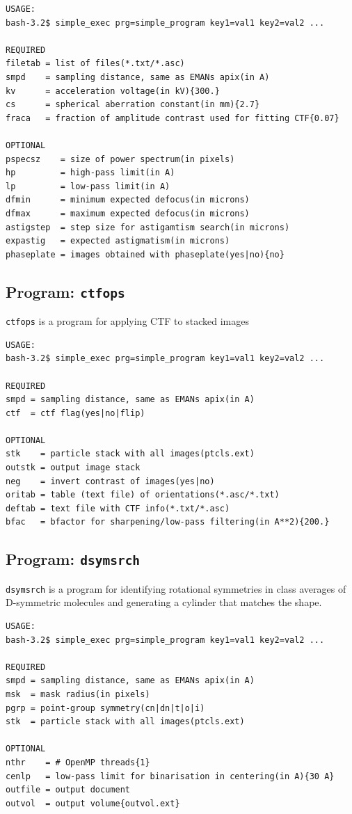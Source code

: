 \documentclass[a4paper,11pt]{article}
\newcommand{\prgname}[1]{\textcolor{NavyBlue}{\texttt{#1}}}
\begin{document}
\begin{verbatim}
USAGE:
bash-3.2$ simple_exec prg=simple_program key1=val1 key2=val2 ...

REQUIRED
filetab = list of files(*.txt/*.asc)
smpd    = sampling distance, same as EMANs apix(in A)
kv      = acceleration voltage(in kV){300.}
cs      = spherical aberration constant(in mm){2.7}
fraca   = fraction of amplitude contrast used for fitting CTF{0.07}

OPTIONAL
pspecsz    = size of power spectrum(in pixels)
hp         = high-pass limit(in A)
lp         = low-pass limit(in A)
dfmin      = minimum expected defocus(in microns)
dfmax      = maximum expected defocus(in microns)
astigstep  = step size for astigamtism search(in microns)
expastig   = expected astigmatism(in microns)
phaseplate = images obtained with phaseplate(yes|no){no}
\end{verbatim}

\subsection{Program: \prgname{ctfops}}
\label{ctfops}
\prgname{ctfops} is a program for applying CTF to stacked images 

\begin{verbatim}
USAGE:
bash-3.2$ simple_exec prg=simple_program key1=val1 key2=val2 ...

REQUIRED
smpd = sampling distance, same as EMANs apix(in A)
ctf  = ctf flag(yes|no|flip)

OPTIONAL
stk    = particle stack with all images(ptcls.ext)
outstk = output image stack
neg    = invert contrast of images(yes|no)
oritab = table (text file) of orientations(*.asc/*.txt)
deftab = text file with CTF info(*.txt/*.asc)
bfac   = bfactor for sharpening/low-pass filtering(in A**2){200.}
\end{verbatim}

\subsection{Program: \prgname{dsymsrch}}
\label{dsymsrch}
\prgname{dsymsrch} is a program for identifying rotational symmetries in class averages of D-symmetric molecules and generating a cylinder that matches the shape.

\begin{verbatim}
USAGE:
bash-3.2$ simple_exec prg=simple_program key1=val1 key2=val2 ...

REQUIRED
smpd = sampling distance, same as EMANs apix(in A)
msk  = mask radius(in pixels)
pgrp = point-group symmetry(cn|dn|t|o|i)
stk  = particle stack with all images(ptcls.ext)

OPTIONAL
nthr    = # OpenMP threads{1}
cenlp   = low-pass limit for binarisation in centering(in A){30 A}
outfile = output document
outvol  = output volume{outvol.ext}
\end{verbatim}
\end{document}
